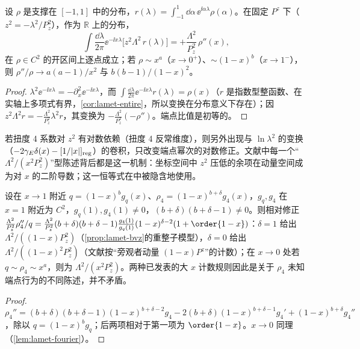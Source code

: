 \begin{lemma}\label{lem:lamet-fourier}
设 $\rho$ 是支撑在 $[-1,1]$ 中的分布，$r(\lambda)=\int_{-1}^1\dd\alpha\,\ee^{\ii\alpha\lambda}\rho(\alpha)$。在固定 $P^z$ 下（$z^2=-\lambda^2/P_z^2$），作为 $\mathbb R$ 上的分布，
\begin{equation}\label{eq:lamet-fourier-lemma}
\int\frac{\dd\lambda}{2\pi}\ee^{-\ii x\lambda}\big[z^2\Lambda^2\,r(\lambda)\big]=+\frac{\Lambda^2}{P_z^2}\,\rho''(x),
\end{equation}%
在 $\rho\in C^2$ 的开区间上逐点成立；若 $\rho\sim x^a$（$x\to0^+$）、$\sim(1-x)^b$（$x\to1^-$），则 $\rho''/\rho\to a(a-1)/x^2$ 与 $b(b-1)/(1-x)^2$。
\end{lemma}

\begin{proof}
$\lambda^2\ee^{-\ii x\lambda}=-\partial_x^2\ee^{-\ii x\lambda}$，而 $\int\frac{\dd\lambda}{2\pi}\ee^{-\ii x\lambda}r(\lambda)=\rho(x)$（$r$ 是指数型整函数、在实轴上多项式有界，\cref{cor:lamet-entire}，所以变换在分布意义下存在）；因 $z^2\Lambda^2r=-\frac{\Lambda^2}{P_z^2}\lambda^2r$，其变换为 $-\frac{\Lambda^2}{P_z^2}(-\rho'')$。端点比值是初等的。
\end{proof}

若扭度 4 系数对 $z^2$ 有对数依赖（扭度 4 反常维度），则另外出现与 $\ln\lambda^2$ 的变换（$-2\gamma_E\delta(x)-[1/|x|]_{\rm reg}$）的卷积，只改变端点幂次的对数修正。文献中每一个“$\Lambda^2/(x^2P_z^2)$”型陈述背后都是这一机制：坐标空间中 $z^2$ 压低的余项在动量空间成为对 $x$ 的二阶导数；这一恒等式在\cite{Braun:2018brg}中被隐含地使用。

\begin{corollary}[端点二分]\label{cor:lamet-endpoint}
设在 $x\to1$ 附近 $q=(1-x)^bg_q(x)$、$\rho_4=(1-x)^{b+\delta}g_4(x)$，$g_q,g_4$ 在 $x=1$ 附近为 $C^2$，$g_q(1),g_4(1)\neq0$，$(b+\delta)(b+\delta-1)\neq0$。则相对修正 $\frac{\Lambda^2}{P_z^2}\rho_4''/q=\frac{\Lambda^2}{P_z^2}(b+\delta)(b+\delta-1)\frac{g_4(1)}{g_q(1)}(1-x)^{\delta-2}(1+\order{1-x})$：$\delta=1$ 给出 $\Lambda^2/((1-x)P_z^2)$（\cref{prop:lamet-bvz}的重整子模型），$\delta=0$ 给出 $\Lambda^2/((1-x)^2P_z^2)$（文献\cite{JiEtAl2021}按“旁观者动量 $(1-x)P^z$”的计数）；在 $x\to0$ 处若 $q\sim\rho_4\sim x^a$，则为 $\Lambda^2/(x^2P_z^2)$。两种已发表的大 $x$ 计数规则因此是关于 $\rho_4$ 未知端点行为的不同陈述，并不矛盾。%
\end{corollary}

\begin{proof}
$\rho_4''=(b+\delta)(b+\delta-1)(1-x)^{b+\delta-2}g_4-2(b+\delta)(1-x)^{b+\delta-1}g_4'+(1-x)^{b+\delta}g_4''$，除以 $q=(1-x)^bg_q$；后两项相对于第一项为 $\order{1-x}$。$x\to0$ 同理（\cref{lem:lamet-fourier}）。
\end{proof}

